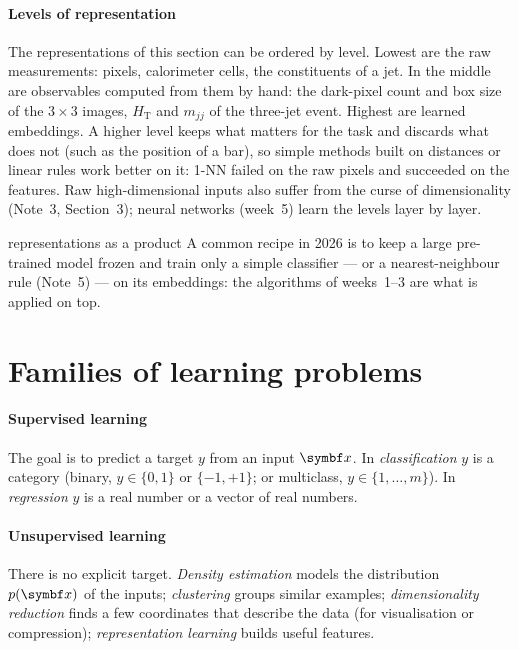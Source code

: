 \documentclass[11pt]{article}
\begin{document}
\paragraph{Levels of representation} The representations of this section can be ordered by level. Lowest are the raw
measurements: pixels, calorimeter cells, the constituents of a jet. In the middle are observables computed from them
by hand: the dark-pixel count and box size of the $3 \times 3$ images, $H_{\mathrm T}$ and $m_{jj}$ of the three-jet
event. Highest are learned embeddings. A higher level keeps what matters for the task and discards what does not
(such as the position of a bar), so simple methods built on distances or linear rules work
better on it: 1-NN failed on the raw pixels and succeeded on the features. Raw high-dimensional inputs also suffer
from the curse of dimensionality (Note~3, Section~3); neural networks (week~5) learn the levels layer by layer.

\begin{modern}{representations as a product}
A common recipe in 2026 is to keep a large pre-trained model frozen and train only a simple classifier --- or a
nearest-neighbour rule (Note~5) --- on its embeddings: the algorithms of weeks~1--3 are what is applied on top.
\end{modern}

\section{Families of learning problems}

\paragraph{Supervised learning} The goal is to predict a target $y$ from an input $\x$. In \emph{classification} $y$ is a category
(binary, $y \in \{0,1\}$ or $\{-1,+1\}$; or multiclass, $y \in \{1, \dots, m\}$). In \emph{regression} $y$ is a real
number or a vector of real numbers.

\paragraph{Unsupervised learning} There is no explicit target. \emph{Density estimation} models the distribution $p(\x)$
of the inputs; \emph{clustering} groups similar examples; \emph{dimensionality reduction} finds a few coordinates that
describe the data (for visualisation or compression); \emph{representation learning} builds useful features.
\end{document}
